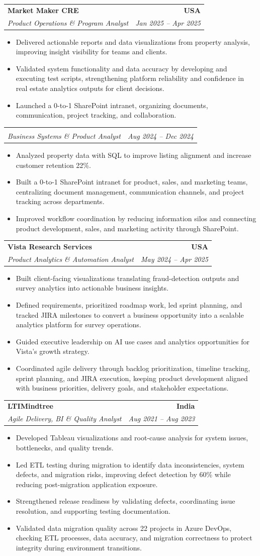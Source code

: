 \documentclass[letterpaper,10pt]{article}
\makeatletter
\newcommand{\resumeItem}[1]{\item \small{#1}}
\newcommand{\resumeSubheading}[4]{
  \vspace{1pt}\item
    \begin{tabular*}{1.0\textwidth}[t]{l@{\extracolsep{\fill}}r}
      \textbf{#1} & \textbf{\small #2} \\
      \textit{\small #3} & \textit{\small #4} \\
    \end{tabular*}\vspace{-6pt}
}
\newcommand{\resumeItemListStart}{\begin{itemize}[leftmargin=0.15in, itemsep=1pt, topsep=3pt]}
\newcommand{\resumeItemListEnd}{\end{itemize}\vspace{-2pt}}
\makeatother
\begin{document}
\vspace{-2pt}

\resumeSubheading
{Market Maker CRE}{USA}
{Product Operations \& Program Analyst}{Jan 2025 -- Apr 2025}
\resumeItemListStart
\resumeItem{Delivered actionable reports and data visualizations from property analysis, improving insight visibility for teams and clients.}
\resumeItem{Validated system functionality and data accuracy by developing and executing test scripts, strengthening platform reliability and confidence in real estate analytics outputs for client decisions.}
\resumeItem{Launched a 0-to-1 SharePoint intranet, organizing documents, communication, project tracking, and collaboration.}
\resumeItemListEnd

\vspace{-12pt}

\resumeSubheading
{}{}
{Business Systems \& Product Analyst}{Aug 2024 -- Dec 2024}
\resumeItemListStart
\resumeItem{Analyzed property data with SQL to improve listing alignment and increase customer retention 22\%.}
\resumeItem{Built a 0-to-1 SharePoint intranet for product, sales, and marketing teams, centralizing document management, communication channels, and project tracking across departments.}
\resumeItem{Improved workflow coordination by reducing information silos and connecting product development, sales, and marketing activity through SharePoint.}
\resumeItemListEnd

\vspace{-2pt}

\resumeSubheading
{Vista Research Services}{USA}
{Product Analytics \& Automation Analyst}{May 2024 -- Apr 2025}
\resumeItemListStart
\resumeItem{Built client-facing visualizations translating fraud-detection outputs and survey analytics into actionable business insights.}
\resumeItem{Defined requirements, prioritized roadmap work, led sprint planning, and tracked JIRA milestones to convert a business opportunity into a scalable analytics platform for survey operations.}
\resumeItem{Guided executive leadership on AI use cases and analytics opportunities for Vista's growth strategy.}
\resumeItem{Coordinated agile delivery through backlog prioritization, timeline tracking, sprint planning, and JIRA execution, keeping product development aligned with business priorities, delivery goals, and stakeholder expectations.}
\resumeItemListEnd

\vspace{-2pt}

\resumeSubheading
{LTIMindtree}{India}
{Agile Delivery, BI \& Quality Analyst}{Aug 2021 -- Aug 2023}
\resumeItemListStart
\resumeItem{Developed Tableau visualizations and root-cause analysis for system issues, bottlenecks, and quality trends.}
\resumeItem{Led ETL testing during migration to identify data inconsistencies, system defects, and migration risks, improving defect detection by 60\% while reducing post-migration application exposure.}
\resumeItem{Strengthened release readiness by validating defects, coordinating issue resolution, and supporting testing documentation.}
\resumeItem{Validated data migration quality across 22 projects in Azure DevOps, checking ETL processes, data accuracy, and migration correctness to protect integrity during environment transitions.}
\resumeItemListEnd
\end{document}
